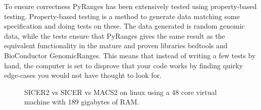 \documentclass[10pt,letterpaper]{article}
\begin{document}
To ensure correctness PyRanges has been extensively tested using property-based
testing. Property-based testing is a method to generate data matching some
specification and doing tests on these. The data generated is random genomic
data, while the tests ensure that PyRanges gives the same result as the
equivalent functionality in the mature and proven libraries
bedtools\cite{doi:10.1093/bioinformatics/btq033} and BioConductor GenomicRanges.
This means that instead of writing a few tests by hand, the computer is set to
disprove that your code works by finding quirky edge-cases you would not have
thought to look for.


\begin{figure}
\begin{center}
  \caption{SICER2
  vs SICER vs MACS2 on linux using a 48 core virtual machine with 189 gigabytes of RAM.}
\end{center}
\end{figure}




\end{document}

